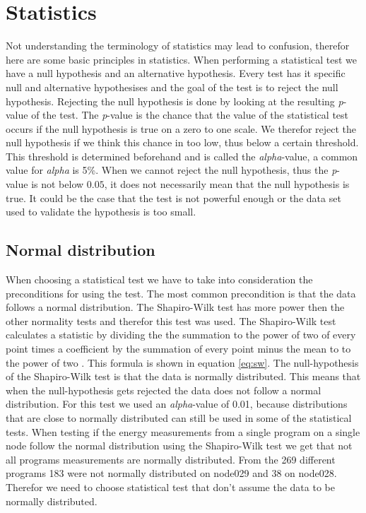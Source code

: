 \section{Statistics}
Not understanding the terminology of statistics may lead to confusion, therefor here are some basic principles in statistics. When performing a statistical test we have a null hypothesis and an alternative hypothesis. Every test has it specific null and alternative hypothesises and the goal of the test is to reject the null hypothesis. Rejecting the null hypothesis is done by looking at the resulting \textit{p}-value of the test. The \textit{p}-value is the chance that the value of the statistical test occurs if the null hypothesis is true on a zero to one scale. We therefor reject the null hypothesis if we think this chance in too low, thus below a certain threshold. This threshold is determined beforehand and is called the \textit{alpha}-value, a common value for  \textit{alpha} is 5\%. When we cannot reject the null hypothesis, thus the \textit{p}-value is not below $0.05$, it does not necessarily mean that the null hypothesis is true. It could be the case that the test is not powerful enough or the data set used to validate the hypothesis is too small.

\subsection{Normal distribution}
When choosing a statistical test we have to take into consideration the preconditions for using the test. The most common precondition is that the data follows a normal distribution. The Shapiro-Wilk test has more power then the other normality tests \cite{razali2011power} and therefor this test was used. The Shapiro-Wilk test calculates a statistic by dividing the the summation to the power of two of every point times a coefficient by the summation of  every point minus the mean to to the power of two \cite{shapiro1965analysis}. This formula is shown in equation \ref{eq:sw}. The null-hypothesis of the Shapiro-Wilk test is that the data is normally distributed. This means that when the null-hypothesis gets rejected the data does not follow a normal distribution. For this test we used an \textit{alpha}-value of 0.01, because distributions that are close to normally distributed can still be used in some of the statistical tests. When testing if the energy measurements from a single program on a single node follow the normal distribution using the Shapiro-Wilk test we get that not all programs measurements are normally distributed. From the 269 different programs 183 were not normally distributed on node029 and 38 on node028. Therefor we need to choose statistical test that don't assume the data to be normally distributed.

